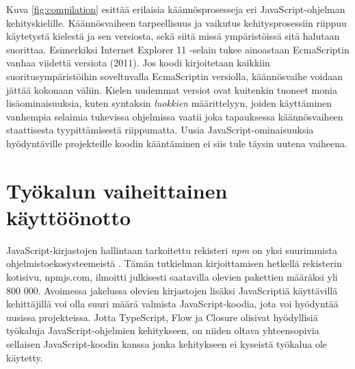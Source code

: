 Kuva \ref{fig:compilation} esittää erilaisia käännösprosesseja eri
JavaScript-ohjelman kehityskielille. Käännösvaiheen tarpeellisuus
ja vaikutus kehitysprosessiin riippuu käytetystä kielestä ja sen versiosta,
sekä siitä missä ympäristöissä sitä halutaan suorittaa.
Esimerkiksi Internet Explorer 11 -selain tukee ainoastaan
EcmaScriptin vanhaa viidettä
versiota (2011). Jos koodi kirjoitetaan kaikkiin
suoritusympäristöihin soveltuvalla EcmaScriptin versiolla,
käännösvaihe voidaan jättää kokonaan väliin. Kielen
uudemmat versiot ovat kuitenkin tuoneet monia lisäominaisuuksia,
kuten syntaksin \textit{luokkien} määrittelyyn, joiden
käyttäminen vanhempia selaimia tukevissa ohjelmissa vaatii joka tapauksessa
käännösvaiheen staattisesta tyypittämisestä riippumatta. Uusia
JavaScript-o\-mi\-nai\-suuk\-si\-a hyödyntäville projekteille koodin kääntäminen ei
siis tule täysin uutena vaiheena.

\section{Työkalun vaiheittainen käyttöönotto}

JavaScript-kirjastojen hallintaan tarkoitettu rekisteri \textit{npm} on yksi
suurimmista ohjelmistoekosysteemeistä \cite{DynamicsOfJSPackages}.
Tämän tutkielman kirjoittamisen hetkellä rekisterin kotisivu,\newline
npmjs.com, ilmoitti julkisesti saatavilla olevien pakettien määräksi yli 800 000.
Avoimessa jakelussa olevien kirjastojen lisäksi JavaScriptiä käyttävillä
kehittäjillä voi olla suuri määrä valmista JavaScript-koodia, jota voi
hyödyntää uusissa projekteissa. Jotta TypeScript, Flow ja Closure olisivat
hyödyllisiä työkaluja JavaScript-ohjelmien kehitykseen, on niiden oltava
yhteensopivia sellaisen JavaScript-koodin kanssa jonka kehitykseen ei
kyseistä työkalua ole käytetty.

